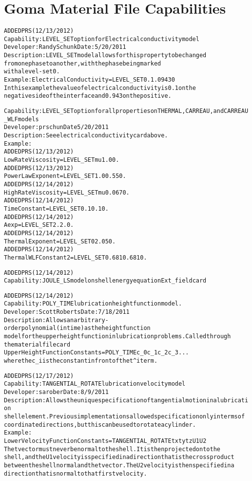 \documentclass{article}
\begin{document}
\section{Goma Material File Capabilities}
\begin{alltt}

ADDED PRS (12/13/2012)
Capability: LEVEL_SET option for Electrical conductivity model
Developer: Randy Schunk  Date: 5/20/2011
Description:  LEVEL_SET model allows for this property to be changed
  from one phase to another, with the phase being marked
  with a level-set 0. 
Example: Electrical Conductivity	= LEVEL_SET  0.1 .0943 0   
  In this example the value of electrical conductivity is 0.1 on the
  negative side of the interface and 0.943 ont he positive.  

Capability: LEVEL_SET option for all properties on THERMAL, CARREAU, and CARREAU_WLF models
Developer: prschun  Date 5/20/2011
Description: See electrical conductivity card above.
Example:
  ADDED PRS (12/13/2012)
  Low Rate Viscosity	          = LEVEL_SET {mu} {1.0} 0.
  ADDED PRS (12/13/2012)
  Power Law Exponent              = LEVEL_SET {1.0} {0.55} 0.
  ADDED PRS (12/14/2012)
  High Rate Viscosity	          = LEVEL_SET {mu}  {0.067} 0.
  ADDED PRS (12/14/2012)
  Time Constant	                  = LEVEL_SET {0.1} {0.1} 0.
  ADDED PRS (12/14/2012)
  Aexp                            = LEVEL_SET      {2.} {2.} 0.
  ADDED PRS (12/14/2012)
  Thermal Exponent                = LEVEL_SET     {0} {2.05} 0.
  ADDED PRS (12/14/2012)
  Thermal WLF Constant2           = LEVEL_SET     {0.681} {0.681} 0.

 ADDED PRS (12/14/2012)
Capability: JOULE_LS model on shell energy equation Ext_field card

ADDED PRS (12/14/2012)
Capability: POLY_TIME lubrication height function model.
Developer:  Scott Roberts  Date:  7/18/2011
Description:  Allows an arbitrary-order polynomial (in time) as the height function 
  model for the upper height function in lubrication problems.  Called through 
  the material file card
Upper Height Function Constants = POLY_TIME c_0 c_1 c_2 c_3 ...
  where the c_i is the constant in front of the t^i term.  

ADDED PRS (12/17/2012)
Capability:  TANGENTIAL_ROTATE lubrication velocity model
Developer:  sarober  Date:  8/9/2011
Description:  Allows the unique specification of tangential motion in a lubrication 
  shell element.  Previous implementations allowed specification only in terms of 
  coordinate directions, but this can be used to rotate a cylinder.
Example:
  Lower Velocity Function Constants = TANGENTIAL_ROTATE {tx} {ty} {tz} {U1} {U2}
  The t vector must never be normal to the shell.  It is then projected onto the 
  shell, and the U1 velocity is specified in a direction that is the cross product 
  between the shell normal and the t vector.  The U2 velocity is then specified in a 
  direction that is normal to that first velocity.


\end{alltt}
\end{document}
